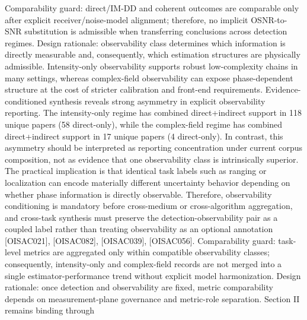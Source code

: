 {}Comparability guard: direct/IM-DD and coherent outcomes are comparable only after explicit receiver/noise-model alignment; therefore, no implicit OSNR-to-SNR substitution is admissible when transferring conclusions across detection regimes.\markdownRendererInterblockSeparator
{}
\markdownRendererSectionEnd \markdownRendererSectionBegin
{}\markdownRendererInterblockSeparator
{}Design rationale: observability class determines which information is directly measurable and, consequently, which estimation structures are physically admissible. Intensity-only observability supports robust low-complexity chains in many settings, whereas complex-field observability can expose phase-dependent structure at the cost of stricter calibration and front-end requirements.\markdownRendererParagraphSeparator
{}Evidence-conditioned synthesis reveals strong asymmetry in explicit observability reporting. The intensity-only regime has combined direct+indirect support in 118 unique papers (58 direct-only), while the complex-field regime has combined direct+indirect support in 17 unique papers (4 direct-only). In contrast, this asymmetry should be interpreted as reporting concentration under current corpus composition, not as evidence that one observability class is intrinsically superior. The practical implication is that identical task labels such as ranging or localization can encode materially different uncertainty behavior depending on whether phase information is directly observable. Therefore, observability conditioning is mandatory before cross-medium or cross-algorithm aggregation, and cross-task synthesis must preserve the detection-observability pair as a coupled label rather than treating observability as an optional annotation [O\markdownRendererUnderscore{}ISAC\markdownRendererUnderscore{}021], [O\markdownRendererUnderscore{}ISAC\markdownRendererUnderscore{}082], [O\markdownRendererUnderscore{}ISAC\markdownRendererUnderscore{}039], [O\markdownRendererUnderscore{}ISAC\markdownRendererUnderscore{}056].\markdownRendererParagraphSeparator
{}Comparability guard: task-level metrics are aggregated only within compatible observability classes; consequently, intensity-only and complex-field records are not merged into a single estimator-performance trend without explicit model harmonization.\markdownRendererInterblockSeparator
{}
\markdownRendererSectionEnd \markdownRendererSectionBegin
{}\markdownRendererInterblockSeparator
{}Design rationale: once detection and observability are fixed, metric comparability depends on measurement-plane governance and metric-role separation. Section II remains binding through\markdownRendererSoftLineBreak
